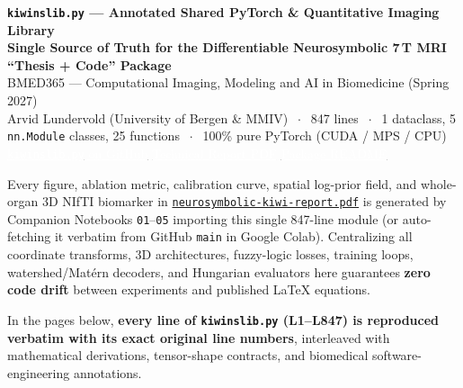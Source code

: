 \documentclass[10pt,a4paper]{article}
\renewcommand{\_}{\origunderscore\allowbreak}
\newcommand{\ghblob}{https://github.com/arvidl/BMED365-2027/blob/main}
\newcommand{\repodir}{Lab4-Comp-Imag/Kiwi-challenge/docs/neurosymbolic-report}
\begin{document}
\thispagestyle{firstpage}

\begin{tcolorbox}[
    enhanced, colback=uibblue, colframe=uibblue,
    arc=3.5pt, left=12pt, right=12pt, top=9pt, bottom=9pt
]
{\Large\bfseries\color{white} \texttt{kiwi\_ns\_lib.py} --- Annotated Shared PyTorch \& Quantitative Imaging Library\\[2pt]
{\large Single Source of Truth for the Differentiable Neurosymbolic 7\,T MRI ``Thesis + Code'' Package}}\\[4pt]
{\normalsize\color{white!90} BMED365 --- Computational Imaging, Modeling and AI in Biomedicine (Spring 2027)}\\[3pt]
{\footnotesize\color{white!84}
Arvid Lundervold (University of Bergen \& MMIV) $\;\cdot\;$
847 lines $\;\cdot\;$ 1 dataclass, 5 \texttt{nn.Module} classes, 25 functions $\;\cdot\;$ 100\% pure PyTorch (CUDA / MPS / CPU)
}\\[6pt]
{\footnotesize
\href{\ghblob/\repodir/notebooks/kiwi_ns_lib.py}{\textcolor{white}{\underline{\texttt{kiwi\_ns\_lib.py} on GitHub}}}\hspace{12pt}
\href{\ghblob/\repodir/neurosymbolic-kiwi-report.pdf}{\textcolor{white}{\underline{Technical Report PDF}}}\hspace{12pt}
\href{\ghblob/\repodir/README.md}{\textcolor{white}{\underline{Package README}}}
}
\end{tcolorbox}

\begin{designbox}
Every figure, ablation metric, calibration curve, spatial log-prior field, and whole-organ 3D NIfTI biomarker in \href{\ghblob/\repodir/neurosymbolic-kiwi-report.pdf}{\texttt{neurosymbolic-kiwi-report.pdf}} is generated by Companion Notebooks \texttt{01}--\texttt{05} importing this single 847-line module (or auto-fetching it verbatim from GitHub \texttt{main} in Google Colab). Centralizing all coordinate transforms, 3D architectures, fuzzy-logic losses, training loops, watershed/Mat\'ern decoders, and Hungarian evaluators here guarantees \textbf{zero code drift} between experiments and published LaTeX equations.

In the pages below, \textbf{every line of \texttt{kiwi\_ns\_lib.py} (L1--L847) is reproduced verbatim with its exact original line numbers}, interleaved with mathematical derivations, tensor-shape contracts, and biomedical software-engineering annotations.
\end{designbox}
\end{document}
